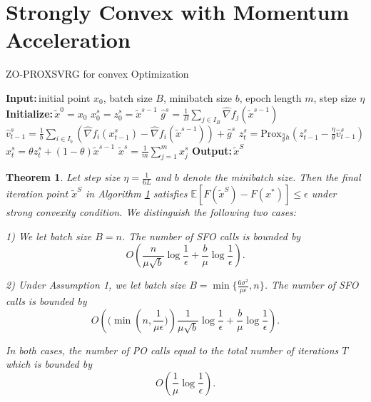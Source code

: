 \documentclass{article}
\newcommand*{\Po}{\text{Prox}}
\newcommand*{\E}{\mathbb{E}}
\newcommand{\Initialize}{\textbf{Initialize:}{\,}}
\newcommand{\Input}{\textbf{Input:}{\,}}
\newcommand{\Output}{\textbf{Output:}{\,}}
\newtheorem{theorem}{Theorem}[section]
\theoremstyle{definition}
\theoremstyle{remark}
\begin{document}
\section{Strongly Convex with Momentum Acceleration}
\begin{algorithm}\label{APGconvex-Algo}
\caption{ZO-PROXSVRG for convex Optimization}\begin{algorithmic}[1]
\State\Input initial point $x_0$, batch size $B$, minibatch size $b$, epoch length $m$, step size $\eta$
\State\Initialize $\tilde{x}^0 = x_0$
\State $x_0^s = z_0^s = \widetilde{x}^{s-1}$
\State $\hat{g}^s = \frac{1}{B} \sum_{j\in I_B} \hat{\nabla} f_j (\widetilde{x}^{s-1})$
\State $\hat{v}_{t-1}^s = \frac{1}{b} \sum_{i\in I_b}\left(\hat{\nabla} f_{i}(x_{t-1}^s)-\hat{\nabla} f_{i}(\tilde{x}^{s-1})\right)+\hat{g}^s$
\State $z_{t}^s= \Po_{\frac{\eta}{\theta} h}(z_{t-1}^s - \frac{\eta}{\theta} \hat{v}_{t-1}^s)$
\State $x_{t}^s = \theta z_{t}^s+(1-\theta)\widetilde{x}^{s-1}$
\EndFor
\State $\tilde{x}^s=\frac{1}{m}\sum_{j=1}^{m}x_j^s$ 
 \EndFor
 \State\Output ${\tilde{x}}^{S}$
\end{algorithmic}
\end{algorithm}
\begin{theorem}\label{lemma1}
Let step size $\eta = \frac{1}{6L}$ and $b$ denote the minibatch size. Then the final iteration point $\widetilde{x}^S$ in Algorithm \ref{} satisfies $\E[F(\widetilde{x}^S) - F(x^*)] \leq \epsilon$ under strong convexity condition. We distinguish the following two cases:

1) We let batch size $B = n$. The number of SFO calls is bounded by
\[
O\left(\frac{n}{\mu\sqrt{b}} \log \frac{1}{\epsilon} + \frac{b}{\mu} \log \frac{1}{\epsilon}\right).
\]   

2) Under Assumption 1, we let batch size $B = \min \{\frac{6\sigma^2}{\mu\epsilon},n\}$. The number of SFO calls is bounded by 
\[
O\left((\min ({n,\frac{1}{\mu\epsilon})})\frac{1}{\mu\sqrt{b}} \log \frac{1}{\epsilon} + \frac{b}{\mu} \log \frac{1}{\epsilon}\right).
\]  

In both cases, the number of PO calls equal to the total number of iterations $T$ which is bounded by 
\[
 O\left( \frac{1}{\mu} \log \frac{1}{\epsilon}\right).
\]
\end{theorem}
\end{document}
